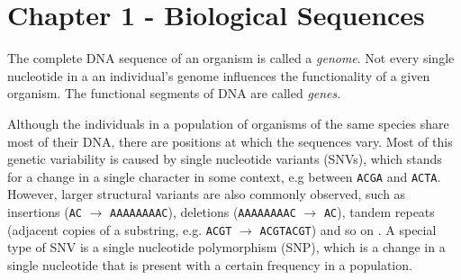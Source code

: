 \hypertarget{chapter-1---biological-sequences}{%
\section{Chapter 1 - Biological Sequences}\label{chapter-1---biological-sequences}}

\label{sec:dna}
The complete DNA sequence of an organism is called a \textit{genome}. Not every single nucleotide in a an individual's genome influences the functionality of a given organism. The functional segments of DNA are called \textit{genes}.

Although the individuals in a population of organisms of the same species share most of their DNA, there are positions at which  the sequences vary. Most of this genetic variability is caused by single nucleotide variants (SNVs), which stands for a change in a single character in some context, e.g between \texttt{ACGA} and \texttt{ACTA}. However, larger structural variants are also commonly observed, such as insertions (\texttt{AC} $\to$ \texttt{AAAAAAAAC}), deletions (\texttt{AAAAAAAAC} $\to$ \texttt{AC}), tandem repeats (adjacent copies of a substring, e.g. \texttt{ACGT} $\to$ \texttt{ACGTACGT}) and so on \cite{structVars}. A special type of SNV is a single nucleotide polymorphism (SNP), which is a change in a single nucleotide that is present with a certain frequency in a population.